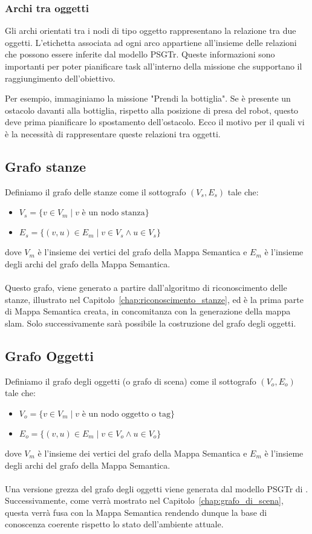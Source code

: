 \subsubsection{Archi tra oggetti}
Gli archi orientati tra i nodi di tipo oggetto rappresentano la relazione tra due oggetti. L'etichetta associata ad ogni arco appartiene all'insieme delle relazioni che possono essere inferite dal modello PSGTr. Queste informazioni sono importanti per poter pianificare task all'interno della missione che supportano il raggiungimento dell'obiettivo.

Per esempio, immaginiamo la missione "Prendi la bottiglia". Se è presente un ostacolo davanti alla bottiglia, rispetto alla posizione di presa del robot, questo deve prima pianificare lo spostamento dell'ostacolo. Ecco il motivo per il quali vi è la necessità di rappresentare queste relazioni tra oggetti.

\subsection{Grafo stanze}
Definiamo il grafo delle stanze come il sottografo $(V_s, E_s)$ tale che:
\begin{itemize}
  \item $V_s = \{v \in V_m \mid v \text{ è un nodo stanza} \}$
  \item $E_s = \{(v,u) \in E_m \mid v \in V_s \wedge u \in V_s \}$
\end{itemize}
dove $V_m$ è l'insieme dei vertici del grafo della Mappa Semantica e $E_m$ è l'insieme degli archi del grafo della Mappa Semantica. \\\\
Questo grafo, viene generato a partire dall'algoritmo di riconoscimento delle stanze, illustrato nel Capitolo~\ref{chap:riconoscimento_stanze}, ed è la prima parte di Mappa Semantica creata, in concomitanza con la generazione della mappa slam. Solo successivamente sarà possibile la costruzione del grafo degli oggetti.
\subsection{Grafo Oggetti}
Definiamo il grafo degli oggetti (o grafo di scena) come il sottografo $(V_o, E_o)$ tale che:
\begin{itemize}
  \item $V_o = \{v \in V_m \mid v \text{ è un nodo oggetto o tag} \}$
  \item $E_o = \{(v,u) \in E_m \mid v \in V_o \wedge u \in V_o \}$
\end{itemize}
dove $V_m$ è l'insieme dei vertici del grafo della Mappa Semantica e $E_m$ è l'insieme degli archi del grafo della Mappa Semantica. \\\\
Una versione grezza del grafo degli oggetti viene generata dal modello PSGTr di \cite{yang2022psg}. Successivamente, come verrà mostrato nel Capitolo~\ref{chap:grafo_di_scena}, questa verrà fusa con la Mappa Semantica rendendo dunque la base di conoscenza coerente rispetto lo stato dell'ambiente attuale.

